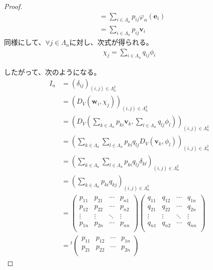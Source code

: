 \documentclass[dvipdfmx]{jsarticle}
\begin{document}
\begin{proof}
\begin{align*}
&= \sum_{i \in \varLambda_{n}} {p_{ij}\varphi_{\alpha}\left( \mathbf{e}_{i} \right)}\\
&= \sum_{i \in \varLambda_{n}} {p_{ij}\mathbf{v}_{i}}
\end{align*}
同様にして、$\forall j \in \varLambda_{n}$に対し、次式が得られる。
\begin{align*}
\chi_{j} = \sum_{i \in \varLambda_{n}} {q_{ij}\phi_{i}}
\end{align*}\par
したがって、次のようになる。
\begin{align*}
I_{n} &= \left( \delta_{ij} \right)_{(i,j) \in \varLambda_{n}^{2}}\\
&= \left( D_{V}\left( \mathbf{w}_{i},\chi_{j} \right) \right)_{(i,j) \in \varLambda_{n}^{2}}\\
&= \left( D_{V}\left( \sum_{k \in \varLambda_{n}} {p_{ki}\mathbf{v}_{k}},\sum_{l \in \varLambda_{n}} {q_{lj}\phi_{l}} \right) \right)_{(i,j) \in \varLambda_{n}^{2}}\\
&= \left( \sum_{k \in \varLambda_{n}} {\sum_{l \in \varLambda_{n}} {p_{ki}q_{lj}D_{V}\left( \mathbf{v}_{k},\phi_{l} \right)}} \right)_{(i,j) \in \varLambda_{n}^{2}}\\
&= \left( \sum_{k \in \varLambda_{n}} {\sum_{l \in \varLambda_{n}} {p_{ki}q_{lj}\delta_{kl}}} \right)_{(i,j) \in \varLambda_{n}^{2}}\\
&= \left( \sum_{k \in \varLambda_{n}} {p_{ki}q_{kj}} \right)_{(i,j) \in \varLambda_{n}^{2}}\\
&= \begin{pmatrix}
p_{11} & p_{21} & \cdots & p_{n1} \\
p_{12} & p_{22} & \cdots & p_{n2} \\
 \vdots & \vdots & \ddots & \vdots \\
p_{1n} & p_{2n} & \cdots & p_{nn} \\
\end{pmatrix}\begin{pmatrix}
q_{11} & q_{12} & \cdots & q_{1n} \\
q_{21} & q_{22} & \cdots & q_{2n} \\
 \vdots & \vdots & \ddots & \vdots \\
q_{n1} & q_{n2} & \cdots & q_{nn} \\
\end{pmatrix}\\
&={}^{t}\begin{pmatrix}
p_{11} & p_{12} & \cdots & p_{1n} \\
p_{21} & p_{22} & \cdots & p_{2n} \\

\end{pmatrix}
\end{align*}
\end{proof}
\end{document}
